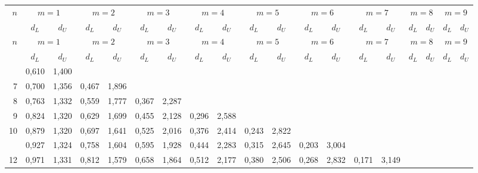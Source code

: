 \documentclass[12pt,a4paper]{article}
\renewcommand{\arraystretch}{1.0}
\begin{document}
\medskip
{}\par\smallskip
{\scriptsize
\setlength{\tabcolsep}{1.5pt}
\renewcommand{\arraystretch}{1.05}
\begin{longtable}{@{\extracolsep{\fill}}rcccccccccccccccccc@{}}
\toprule
$n$ & \multicolumn{2}{c}{$m = 1$} & \multicolumn{2}{c}{$m = 2$} & \multicolumn{2}{c}{$m = 3$} & \multicolumn{2}{c}{$m = 4$} & \multicolumn{2}{c}{$m = 5$} & \multicolumn{2}{c}{$m = 6$} & \multicolumn{2}{c}{$m = 7$} & \multicolumn{2}{c}{$m = 8$} & \multicolumn{2}{c}{$m = 9$} \\
\cmidrule(lr){2-3} \cmidrule(lr){4-5} \cmidrule(lr){6-7} \cmidrule(lr){8-9} \cmidrule(lr){10-11} \cmidrule(lr){12-13} \cmidrule(lr){14-15} \cmidrule(lr){16-17} \cmidrule(lr){18-19}
 & $d_L$ & $d_U$ & $d_L$ & $d_U$ & $d_L$ & $d_U$ & $d_L$ & $d_U$ & $d_L$ & $d_U$ & $d_L$ & $d_U$ & $d_L$ & $d_U$ & $d_L$ & $d_U$ & $d_L$ & $d_U$ \\
\midrule
\endfirsthead
\toprule
$n$ & \multicolumn{2}{c}{$m = 1$} & \multicolumn{2}{c}{$m = 2$} & \multicolumn{2}{c}{$m = 3$} & \multicolumn{2}{c}{$m = 4$} & \multicolumn{2}{c}{$m = 5$} & \multicolumn{2}{c}{$m = 6$} & \multicolumn{2}{c}{$m = 7$} & \multicolumn{2}{c}{$m = 8$} & \multicolumn{2}{c}{$m = 9$} \\
\cmidrule(lr){2-3} \cmidrule(lr){4-5} \cmidrule(lr){6-7} \cmidrule(lr){8-9} \cmidrule(lr){10-11} \cmidrule(lr){12-13} \cmidrule(lr){14-15} \cmidrule(lr){16-17} \cmidrule(lr){18-19}
 & $d_L$ & $d_U$ & $d_L$ & $d_U$ & $d_L$ & $d_U$ & $d_L$ & $d_U$ & $d_L$ & $d_U$ & $d_L$ & $d_U$ & $d_L$ & $d_U$ & $d_L$ & $d_U$ & $d_L$ & $d_U$ \\
\midrule
\endhead
\bottomrule
\endfoot
6 & 0,610 & 1,400 &  &  &  &  &  &  &  &  &  &  &  &  &  &  &  &  \\
7 & 0,700 & 1,356 & 0,467 & 1,896 &  &  &  &  &  &  &  &  &  &  &  &  &  &  \\
8 & 0,763 & 1,332 & 0,559 & 1,777 & 0,367 & 2,287 &  &  &  &  &  &  &  &  &  &  &  &  \\
9 & 0,824 & 1,320 & 0,629 & 1,699 & 0,455 & 2,128 & 0,296 & 2,588 &  &  &  &  &  &  &  &  &  &  \\
10 & 0,879 & 1,320 & 0,697 & 1,641 & 0,525 & 2,016 & 0,376 & 2,414 & 0,243 & 2,822 &  &  &  &  &  &  &  &  \\
\addlinespace[2pt]
11 & 0,927 & 1,324 & 0,758 & 1,604 & 0,595 & 1,928 & 0,444 & 2,283 & 0,315 & 2,645 & 0,203 & 3,004 &  &  &  &  &  &  \\
12 & 0,971 & 1,331 & 0,812 & 1,579 & 0,658 & 1,864 & 0,512 & 2,177 & 0,380 & 2,506 & 0,268 & 2,832 & 0,171 & 3,149 &  &  &  &  \\

\end{longtable}}
\end{document}
